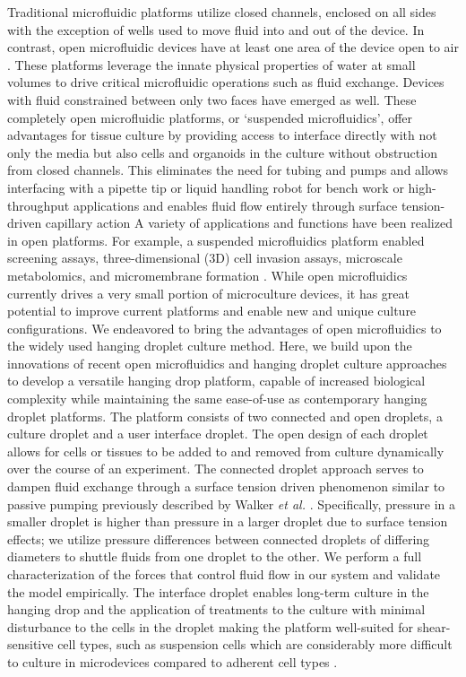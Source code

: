 Traditional microfluidic platforms utilize closed channels, enclosed on all sides with the exception of wells used to move fluid into and out of the device. In contrast, open microfluidic devices have at least one area of the device open to air \cite{Kaigala2012, Zimmermann2005, Walker2002}. These platforms leverage the innate physical properties of water at small volumes to drive critical microfluidic operations such as fluid exchange. Devices with fluid constrained between only two faces have emerged as well. These completely open microfluidic platforms, or ‘suspended microfluidics’, offer advantages for tissue culture by providing access to interface directly with not only the media but also cells and organoids in the culture without obstruction from closed channels. This eliminates the need for tubing and pumps and allows interfacing with a pipette tip or liquid handling robot for bench work or high-throughput applications and enables fluid flow entirely through surface tension-driven capillary action A variety of applications and functions have been realized in open platforms. For example, a suspended microfluidics platform enabled screening assays, three-dimensional (3D) cell invasion assays, microscale metabolomics, and micromembrane formation \cite{Casavant2013}. While open microfluidics currently drives a very small portion of microculture devices, it has great potential to improve current platforms and enable new and unique culture configurations. We endeavored to bring the advantages of open microfluidics to the widely used hanging droplet culture method.
Here, we build upon the innovations of recent open microfluidics and hanging droplet culture approaches to develop a versatile hanging drop platform, capable of increased biological complexity while maintaining the same ease-of-use as contemporary hanging droplet platforms. The platform consists of two connected and open droplets, a culture droplet and a user interface droplet. The open design of each droplet allows for cells or tissues to be added to and removed from culture dynamically over the course of an experiment. The connected droplet approach serves to dampen fluid exchange through a surface tension driven phenomenon similar to passive pumping previously described by Walker \textit{et al.}  \cite{Beebe2002a}.  Specifically, pressure in a smaller droplet is higher than pressure in a larger droplet due to surface tension effects; we utilize pressure differences between connected droplets of differing diameters to shuttle fluids from one droplet to the other.  We perform a full characterization of the forces that control fluid flow in our system and validate the model empirically. The interface droplet enables long-term culture in the hanging drop and the application of treatments to the culture with minimal disturbance to the cells in the droplet making the platform well-suited for shear-sensitive cell types, such as suspension cells which are considerably more difficult to culture in microdevices compared to adherent cell types \cite{Young2012}. 

